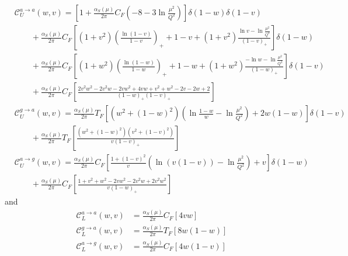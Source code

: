 \begin{equation}
    \begin{aligned}
          &\mathcal{C}^{a\to a}_U (w,v)= \left[1+\frac{\alpha_S(\mu)}{2\pi}C_F\left(-8-3\ln\frac{\mu^2}{Q^2}\right)\right]\delta(1-w)\delta(1-v)\\
        &\qquad+\frac{\alpha_S(\mu)}{2\pi}C_F\left[(1+v^2)\left(\frac{\ln(1-v)}{1-v}\right)_+ +1-v+(1+v^2)\frac{\ln v - \ln\frac{\mu^2}{Q^2}}{(1-v)_+}\right]\delta(1-w)\\
        &\qquad+\frac{\alpha_S(\mu)}{2\pi}C_F\left[(1+w^2)\left(\frac{\ln(1-w)}{1-w}\right)_+ +1-w+(1+w^2)\frac{-\ln w - \ln\frac{\mu^2}{Q^2}}{(1-w)_+}\right]\delta(1-v)\\
        &\qquad+\frac{\alpha_S(\mu)}{2\pi}C_F\left[\frac{2v^2w^2-2v^2w-2vw^2+4vw+v^2+w^2-2v-2w+2}{(1-w)_+(1-v)_+}\right]\\
        &\mathcal{C}^{g\to a}_U (w,v)=\frac{\alpha_S(\mu)}{2\pi}T_F\left[(w^2+(1-w)^2)\left(\ln \frac{1-w}{w}-\ln\frac{\mu^2}{Q^2}\right)+2w(1-w)\right]\delta(1-v)\\
        &\qquad+\frac{\alpha_S(\mu)}{2\pi}T_F\left[\frac{(w^2+(1-w)^2)(v^2+(1-v)^2)}{v(1-v)_+}\right]\\
         &\mathcal{C}^{a\to g}_U (w,v)=\frac{\alpha_S(\mu)}{2\pi} C_F\left[\frac{1+(1-v)^2}{v}\left(\ln \left(v(1-v)\right)-\ln\frac{\mu^2}{Q^2}\right)+v\right]\delta(1-w)\\
        &\qquad +\frac{\alpha_S(\mu)}{2\pi} C_F\left[\frac{1+v^2+w^2-2vw^2-2v^2w+2v^2w^2}{v(1-w)_+}\right]
    \end{aligned}
\end{equation}
and
\begin{equation}
    \begin{aligned}
          \mathcal{C}^{a\to a}_L (w,v)&= \frac{\alpha_S(\mu)}{2\pi} C_F\left[4 vw\right]\\
        \mathcal{C}^{g\to a}_L (w,v)&=\frac{\alpha_S(\mu)}{2\pi}T_F\left[8w(1-w)\right]\\
         \mathcal{C}^{a\to g}_L (w,v)&=\frac{\alpha_S(\mu)}{2\pi}C_F\left[4w(1-v)\right]
    \end{aligned}
\end{equation}


